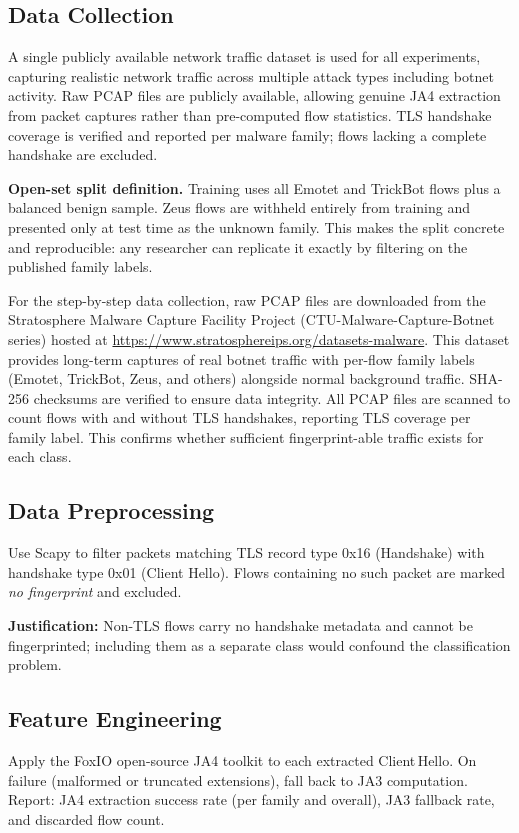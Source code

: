 \documentclass[12pt,a4paper]{report}
\begin{document}
\subsection{Data Collection}
A single publicly available network traffic dataset is used for all experiments, capturing realistic network traffic across multiple attack types including botnet activity. Raw PCAP files are publicly available, allowing genuine JA4 extraction from packet captures rather than pre-computed flow statistics. TLS handshake coverage is verified and reported per malware family; flows lacking a complete handshake are excluded.

\textbf{Open-set split definition.} Training uses all Emotet and TrickBot flows plus a balanced benign sample. Zeus flows are withheld entirely from training and presented only at test time as the unknown family. This makes the split concrete and reproducible: any researcher can replicate it exactly by filtering on the published family labels.

For the step-by-step data collection, raw PCAP files are downloaded from the Stratosphere Malware Capture Facility Project (CTU-Malware-Capture-Botnet series) hosted at \url{https://www.stratosphereips.org/datasets-malware}. This dataset provides long-term captures of real botnet traffic with per-flow family labels (Emotet, TrickBot, Zeus, and others) alongside normal background traffic. SHA-256 checksums are verified to ensure data integrity. All PCAP files are scanned to count flows with and without TLS handshakes, reporting TLS coverage per family label. This confirms whether sufficient fingerprint-able traffic exists for each class.

\subsection{Data Preprocessing}
Use Scapy to filter packets matching TLS record type 0x16 (Handshake) with handshake type 0x01 (Client Hello). Flows containing no such packet are marked \textit{no fingerprint} and excluded.

\textbf{Justification:} Non-TLS flows carry no handshake metadata and cannot be fingerprinted; including them as a separate class would confound the classification problem.

\subsection{Feature Engineering}
Apply the FoxIO open-source JA4 toolkit to each extracted Client\,Hello. On failure (malformed or truncated extensions), fall back to JA3 computation. Report: JA4 extraction success rate (per family and overall), JA3 fallback rate, and discarded flow count.
\end{document}
